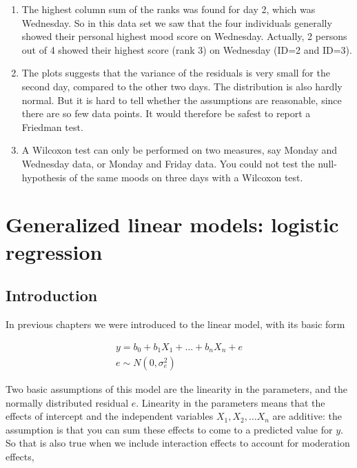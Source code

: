 \documentclass[]{book}\usepackage[]{graphicx}\usepackage[]{color}
\begin{document}
\begin{enumerate}
\item The highest column sum of the ranks was found for day 2, which was Wednesday. So in this data set we saw that the four individuals generally showed their personal highest mood score on Wednesday. Actually, 2 persons out of 4 showed their highest score (rank 3) on Wednesday (ID=2 and ID=3).

\item The plots suggests that the variance of the residuals is very small for the second day, compared to the other two days. The distribution is also hardly normal. But it is hard to tell whether the assumptions are reasonable, since there are so few data points. It would therefore be safest to report a Friedman test.

\item A Wilcoxon test can only be performed on two measures, say Monday and Wednesday data, or Monday and Friday data. You could not test the null-hypothesis of the same moods on three days with a Wilcoxon test.

\end{enumerate}








\chapter{Generalized linear models: logistic regression}\label{chap:logistic}

\section{Introduction}
In previous chapters we were introduced to the linear model, with its basic form


\begin{eqnarray}
y = b_0 + b_1 X_1 + \dots + b_n X_n + e \\
e \sim N(0, \sigma_e^2)
\end{eqnarray}

Two basic assumptions of this model are the linearity in the parameters, and the normally distributed residual $e$. Linearity in the parameters means that the effects of intercept and the independent variables $X_1, X_2, \dots X_n$ are additive: the assumption is that you can sum these effects to come to a predicted value for $y$. So that is also true when we include interaction effects to account for moderation effects,
\end{document}

